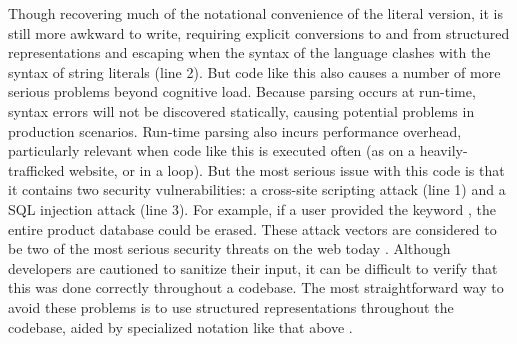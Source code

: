 Though recovering much of the notational convenience of the literal version, it is still more awkward to write, requiring explicit conversions to and from structured representations and escaping when the syntax of the language clashes with the syntax of string literals (line 2). But code like this also causes a number of more serious problems beyond cognitive load. Because parsing occurs at run-time, syntax errors will not be discovered statically, causing potential problems in production scenarios. Run-time parsing also incurs performance overhead, particularly relevant when code like this is executed often (as on a heavily-trafficked website, or in a loop). But the most serious issue with this code is that it contains two security vulnerabilities: a cross-site scripting attack (line 1) and a SQL injection attack (line 3). For example, if a user provided the keyword , the entire product database could be erased. These attack vectors are considered to be two of the most serious security threats on the web today \cite{owasp2013}. Although developers are cautioned to sanitize their input, it can be difficult to verify that this was done correctly throughout a codebase. The most straightforward way to avoid these problems is to use structured representations throughout the codebase, aided by specialized notation like that above \cite{Bravenboer:2007:PIA:1289971.1289975}.

